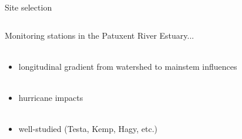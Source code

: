 \documentclass[serif]{beamer}\usepackage[]{graphicx}\usepackage[]{color}
\begin{document}
\begin{frame}{Site selection}
\begin{columns}[T]
\begin{column}{0.45\textwidth}
Monitoring stations in the Patuxent River Estuary... \\~\\
\begin{itemize}
\item longitudinal gradient from watershed to mainstem influences \\~\\
\item hurricane impacts \\~\\
\item well-studied (Testa, Kemp, Hagy, etc.)
\end{itemize}
\end{column}
\begin{column}{0.45\textwidth}
\centerline{}
\end{column}
\end{columns}
\end{frame}
\end{document}
